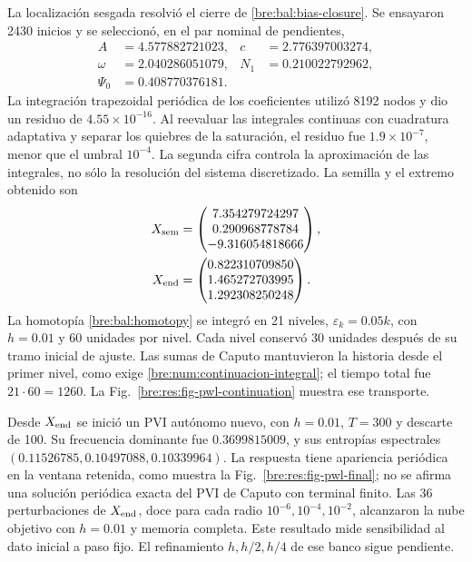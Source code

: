 La localización sesgada resolvió el cierre de
\eqref{bre:bal:bias-closure}. Se ensayaron 2430 inicios y se seleccionó,
en el par nominal de pendientes,
\[
 \begin{aligned}
 A&=4.577882721023,&c&=2.776397003274,\\
 \omega&=2.040286051079,&N_1&=0.210022792962,\\
 \Psi_0&=0.408770376181.
 \end{aligned}
\]
La integración trapezoidal periódica de los coeficientes utilizó 8192 nodos
y dio un residuo de \(4.55\times10^{-16}\). Al reevaluar las integrales
continuas con cuadratura adaptativa y separar los quiebres de la saturación,
el residuo fue \(1.9\times10^{-7}\), menor que el umbral \(10^{-4}\). La
segunda cifra controla la aproximación de las integrales, no sólo la
resolución del sistema discretizado. La semilla y el extremo obtenido son
\begin{equation}
 \begin{aligned}
 X_{\rm sem}&=\begin{pmatrix}
 7.354279724297\\0.290968778784\\-9.316054818666
 \end{pmatrix},\\
 X_{\rm end}&=\begin{pmatrix}
 0.822310709850\\1.465272703995\\1.292308250248
 \end{pmatrix}.
 \end{aligned}
 \label{bre:res:pwl-seeds}
\end{equation}
La homotopía \eqref{bre:bal:homotopy} se integró en 21 niveles,
\(\varepsilon_k=0.05k\), con \(h=0.01\) y 60 unidades por nivel. Cada nivel
conservó 30 unidades después de su tramo inicial de ajuste. Las sumas de
Caputo mantuvieron la historia desde el primer nivel, como exige
\eqref{bre:num:continuacion-integral}; el tiempo total fue \(21\cdot60=1260\).
La Fig.~\ref{bre:res:fig-pwl-continuation} muestra ese transporte.

Desde \(X_{\rm end}\) se inició un PVI autónomo nuevo, con \(h=0.01\),
\(T=300\) y descarte de 100. Su frecuencia dominante fue
\(0.3699815009\), y sus entropías espectrales
\((0.11526785,0.10497088,0.10339964)\). La respuesta tiene apariencia
periódica en la ventana retenida, como muestra la
Fig.~\ref{bre:res:fig-pwl-final}; no se afirma una solución periódica exacta
del PVI de Caputo con terminal finito. Las 36 perturbaciones de
\(X_{\rm end}\), doce para cada radio \(10^{-6},10^{-4},10^{-2}\),
alcanzaron la nube objetivo con \(h=0.01\) y memoria completa. Este resultado
mide sensibilidad al dato inicial a paso fijo. El refinamiento
\(h,h/2,h/4\) de ese banco sigue pendiente.

